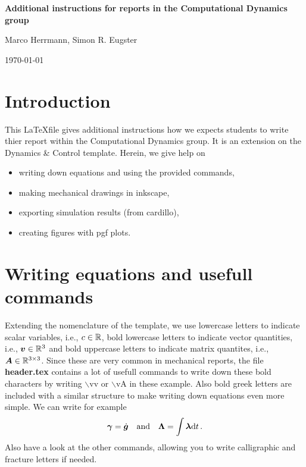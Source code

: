 \documentclass[a4paper,10pt,english]{article}
\begin{document}
	
\begin{center}
	\textbf{\large Additional instructions for reports in the Computational Dynamics group}
	
	\qquad
	
	Marco Herrmann, %
	Simon R. Eugster

	\today
	
	
	
\end{center}


\section*{Introduction}

This \LaTeX file gives additional instructions how we expects students to write thier report within the Computational Dynamics group. It is an extension on the Dynamics \& Control template. Herein, we give help on
%
\begin{itemize}
	\item writing down equations and using the provided commands, 
	\item making mechanical drawings in inkscape, 
	\item exporting simulation results (from cardillo),
	\item creating figures with pgf plots.
\end{itemize}
%
\section{Writing equations and usefull commands}
%
Extending the nomenclature of the template, we use lowercase letters to indicate scalar variables, i.e., $c \in \mR$, bold lowercase letters to indicate vector quantities, i.e., $\vv \in \mR^3$ and bold uppercase letters to indicate matrix quantites, i.e., $\vA \in \mR^{3 \times 3}$. Since these are very common in mechanical reports, the file \textbf{header.tex} contains a lot of usefull commands to write down these bold characters by writing $\backslash$vv or $\backslash$vA in these example. Also bold greek letters are included with a similar structure to make writing down equations even more simple. We can write for example 
%
\begin{equation}
	\vga = \dot{\vg}
	\textAND
	\vLa = \int \vla \diff[t]
	\, .
\end{equation}
%
Also have a look at the other commands, allowing you to write calligraphic and fracture letters if needed. 
\end{document}
